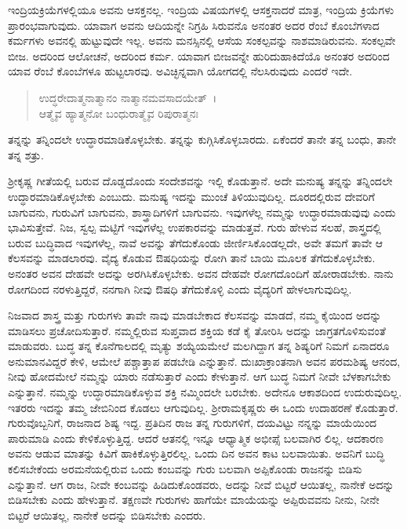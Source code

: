 ಇಂದ್ರಿಯಕ್ರಿಯೆಗಳಲ್ಲಿಯೂ ಅವನು ಆಸಕ್ತನಲ್ಲ. ಇಂದ್ರಿಯ ವಿಷಯಗಳಲ್ಲಿ ಆಸಕ್ತನಾದರೆ ಮಾತ್ರ, ಇಂದ್ರಿಯ ಕ್ರಿಯೆಗಳು ಪ್ರಾರಂಭವಾಗುವುದು. ಯಾವಾಗ ಅವನು ಆದಿಯನ್ನೇ ನಿಗ್ರಹಿ ಸಿರುವನೊ ಅನಂತರ ಅದರ ರೆಂಬೆ ಕೊಂಬೆಗಳಾದ ಕರ್ಮಗಳು ಅವನಲ್ಲಿ ಹುಟ್ಟುವುದೇ ಇಲ್ಲ. ಅವನು ಮನಸ್ಸಿನಲ್ಲಿ ಆಸೆಯ ಸಂಕಲ್ಪವನ್ನು ನಾಶಮಾಡಿರುವನು. ಸಂಕಲ್ಪವೇ ಬೀಜ. ಅದರಿಂದ ಆಲೋಚನೆ, ಅದರಿಂದ ಕರ್ಮ. ಯಾವಾಗ ಬೀಜವನ್ನೇ ಹುರಿದುಹಾಕಿದೆಯೊ ಅನಂತರ ಅದರಿಂದ ಯಾವ ರೆಂಬೆ ಕೊಂಬೆಗಳೂ ಹುಟ್ಟಲಾರವು. ಅವಿಚ್ಛಿನ್ನವಾಗಿ ಯೋಗದಲ್ಲಿ ನೆಲಸಿರುವುದು ಎಂದರೆ ಇದೇ.

\begin{verse}
ಉದ್ಧರೇದಾತ್ಮನಾತ್ಮಾನಂ ನಾತ್ಮಾನಮವಸಾದಯೇತ್~।\\ಆತ್ಮೈವ ಹ್ಯಾತ್ಮನೋ ಬಂಧುರಾತ್ಮೈವ ರಿಪುರಾತ್ಮನಃ 
\end{verse}

{\small ತನ್ನನ್ನು ತನ್ನಿಂದಲೇ ಉದ್ಧಾರಮಾಡಿಕೊಳ್ಳಬೇಕು. ತನ್ನನ್ನು ಕುಗ್ಗಿಸಿಕೊಳ್ಳಬಾರದು. ಏಕೆಂದರೆ ತಾನೇ ತನ್ನ ಬಂಧು, ತಾನೇ ತನ್ನ ಶತ್ರು.}

ಶ‍್ರೀಕೃಷ್ಣ ಗೀತೆಯಲ್ಲಿ ಬರುವ ದೊಡ್ಡದೊಂದು ಸಂದೇಶವನ್ನು ಇಲ್ಲಿ ಕೊಡುತ್ತಾನೆ. ಅದೇ ಮನುಷ್ಯ ತನ್ನನ್ನು ತನ್ನಿಂದಲೇ ಉದ್ಧಾರಮಾಡಿಕೊಳ್ಳಬೇಕು ಎಂಬುದು. ಮನುಷ್ಯ ಇದನ್ನು ಮುಂಚೆ ತಿಳಿಯುವುದಿಲ್ಲ. ದೂರದಲ್ಲಿರುವ ದೇವರಿಗೆ ಬಾಗುವನು, ಗುರುವಿಗೆ ಬಾಗುವನು, ಶಾಸ್ತ್ರಾದಿಗಳಿಗೆ ಬಾಗುವನು. ಇವುಗಳೆಲ್ಲ ನಮ್ಮನ್ನು ಉದ್ಧಾರಮಾಡುವುವು ಎಂದು ಭಾವಿಸುತ್ತೇವೆ. ನಿಜ, ಸ್ವಲ್ಪ ಮಟ್ಟಿಗೆ ಇವುಗಳೆಲ್ಲ ಉಪಕಾರವನ್ನು ಮಾಡುತ್ತವೆ. ಗುರು ಹೇಳುವ ಸಲಹೆ, ಶಾಸ್ತ್ರದಲ್ಲಿ ಬರುವ ಬುದ್ಧಿವಾದ ಇವುಗಳೆಲ್ಲ, ನಾವೆ ಅವನ್ನು ತೆಗೆದುಕೊಂಡು ಜೀರ್ಣಿಸಿಕೊಂಡಲ್ಲದೇ, ಅವೇ ತಮಗೆ ತಾವೇ ಆ ಕೆಲಸವನ್ನು ಮಾಡಲಾರವು. ವೈದ್ಯ ಕೊಡುವ ಔಷಧಿಯನ್ನು ರೋಗಿ ತಾನೆ ಬಾಯಿ ಮೂಲಕ ತೆಗೆದುಕೊಳ್ಳಬೇಕು. ಅನಂತರ ಅವನ ದೇಹವೇ ಅದನ್ನು ಅರಗಿಸಿಕೊಳ್ಳಬೇಕು. ಅವನ ದೇಹವೇ ರೋಗದೊಂದಿಗೆ ಹೋರಾಡಬೇಕು. ನಾನು ರೋಗದಿಂದ ನರಳುತ್ತಿದ್ದರೆ, ನನಗಾಗಿ ನೀವು ಔಷಧಿ ತೆಗೆದುಕೊಳ್ಳಿ ಎಂದು ವೈದ್ಯರಿಗೆ ಹೇಳಲಾಗುವುದಿಲ್ಲ.

ನಿಜವಾದ ಶಾಸ್ತ್ರ ಮತ್ತು ಗುರುಗಳು ತಾವೇ ನಾವು ಮಾಡಬೇಕಾದ ಕೆಲಸವನ್ನು ಮಾಡದೆ, ನಮ್ಮ ಕೈಯಿಂದ ಅದನ್ನು ಮಾಡಿಸಲು ಪ್ರಚೋದಿಸುತ್ತಾರೆ. ನಮ್ಮಲ್ಲಿರುವ ಸುಪ್ತವಾದ ಶಕ್ತಿಯ ಕಡೆ ಕೈ ತೋರಿಸಿ ಅದನ್ನು ಜಾಗ್ರತಗೊಳಿಸುವಂತೆ ಮಾಡುವರು. ಬುದ್ಧ ತನ್ನ ಕೊನೆಗಾಲದಲ್ಲಿ ಮೃತ್ಯು ಶಯ್ಯೆಯಮೇಲೆ ಮಲಗಿದ್ದಾಗ ತನ್ನ ಶಿಷ್ಯರಿಗೆ ನಿಮಗೆ ಏನಾದರೂ ಅನುಮಾನವಿದ್ದರೆ ಕೇಳಿ, ಆಮೇಲೆ ಪಶ್ಚಾತ್ತಾಪ ಪಡಬೇಡಿ ಎನ್ನುತ್ತಾನೆ. ದುಃಖಾಕ್ರಾಂತನಾಗಿ ಅವನ ಪರಮಶಿಷ್ಯ ಆನಂದ, ನೀವು ಹೋದಮೇಲೆ ನಮ್ಮನ್ನು ಯಾರು ನಡೆಸುತ್ತಾರೆ ಎಂದು ಕೇಳುತ್ತಾನೆ. ಆಗ ಬುದ್ಧ ನಿಮಗೆ ನೀವೇ ಬೆಳಕಾಗಬೇಕು ಎನ್ನುತ್ತಾನೆ. ನಮ್ಮನ್ನು ಉದ್ಧಾರಮಾಡಿಕೊಳ್ಳುವ ಶಕ್ತಿ ನಮ್ಮಿಂದಲೇ ಬರಬೇಕು. ಅದೇನೂ ಆಕಾಶದಿಂದ ಉದುರುವುದಿಲ್ಲ. ಇತರರು ಇದನ್ನು ತಮ್ಮ ಜೇಬಿನಿಂದ ಕೊಡಲು ಆಗುವುದಿಲ್ಲ. ಶ‍್ರೀರಾಮಕೃಷ್ಣರು ಈ ಒಂದು ಉದಾಹರಣೆ ಕೊಡುತ್ತಾರೆ. ಗುರುವೊಬ್ಬನಿಗೆ, ರಾಜನಾದ ಶಿಷ್ಯ ಇದ್ದ. ಪ್ರತಿದಿನ ರಾಜ ತನ್ನ ಗುರುಗಳಿಗೆ, ದಯವಿಟ್ಟು ನನ್ನನ್ನು ಮಾಯೆಯಿಂದ ಪಾರುಮಾಡಿ ಎಂದು ಕೇಳಿಕೊಳ್ಳುತ್ತಿದ್ದ. ಆದರೆ ಆತನಲ್ಲಿ ಇನ್ನೂ ಆಧ್ಯಾತ್ಮಿಕ ಅಭೀಪ್ಸೆ ಬಲವಾಗಿರ ಲಿಲ್ಲ. ಆದಕಾರಣ ಅವನು ಆಡುವ ಮಾತನ್ನು ಕಿವಿಗೆ ಹಾಕಿಕೊಳ್ಳುತ್ತಿರಲಿಲ್ಲ. ಒಂದು ದಿನ ಅವನ ಕಾಟ ಬಲವಾಯಿತು. ಅವನಿಗೆ ಬುದ್ಧಿ ಕಲಿಸಬೇಕೆಂದು ಅರಮನೆಯಲ್ಲಿರುವ ಒಂದು ಕಂಬವನ್ನು ಗುರು ಬಲವಾಗಿ ಅಪ್ಪಿಕೊಂಡು ರಾಜನನ್ನು ಬಿಡಿಸು ಎನ್ನುತ್ತಾನೆ. ಆಗ ರಾಜ, ನೀವೇ ಕಂಬವನ್ನು ಹಿಡಿದುಕೊಂಡವರು, ಅದನ್ನು ನೀವೆ ಬಿಟ್ಟರೆ ಆಯಿತಲ್ಲ, ನಾನೇಕೆ ಅದನ್ನು ಬಿಡಿಸಬೇಕು ಎಂದು ಹೇಳುತ್ತಾನೆ. ತಕ್ಷಣವೇ ಗುರುಗಳು ಹಾಗೆಯೇ ಮಾಯೆಯನ್ನು ಅಪ್ಪಿರುವವನು ನೀನು, ನೀನೇ ಬಿಟ್ಟರೆ ಆಯಿತಲ್ಲ, ನಾನೇಕೆ ಅದನ್ನು ಬಿಡಿಸಬೇಕು ಎಂದರು.

